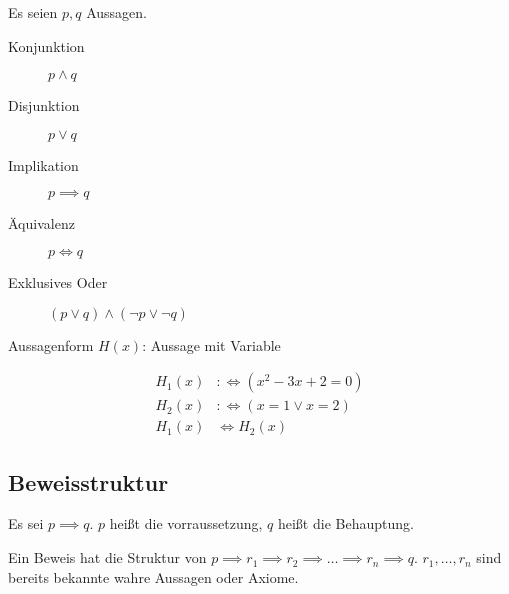 \begin{definition}
  Es seien $p, q$ Aussagen.
  \begin{description}
  \item[Konjunktion] $p \wedge q$\index[sym]{$\wedge$}
  \item[Disjunktion] $p \vee q$\index[sym]{$\vee$}
  \item[Implikation] $p \implies q$\index[sym]{$\implies$}
  \item[Äquivalenz] $p \iff q$\index[sym]{$\iff$}
  \item[Exklusives Oder] $(p \vee q) \wedge (\neg p \vee \neg q)$
  \end{description}
\end{definition}

\begin{definition}
  Aussagenform $H(x)$: Aussage mit Variable
\end{definition}
\begin{example}
  \begin{align*}
    H_1(x) &:\iff (x^2 - 3x + 2 = 0) \\
    H_2(x) &:\iff (x = 1 \vee x = 2) \\
    H_1(x) &\iff H_2(x)
  \end{align*}
\end{example}

\subsection{Beweisstruktur}
Es sei $p \implies q$. $p$ heißt die vorraussetzung, $q$ heißt die Behauptung.

Ein Beweis hat die Struktur von $p \implies r_1 \implies r_2 \implies \dots \implies r_n \implies q$. $r_1, \dots, r_n$ sind bereits bekannte wahre Aussagen oder Axiome.

